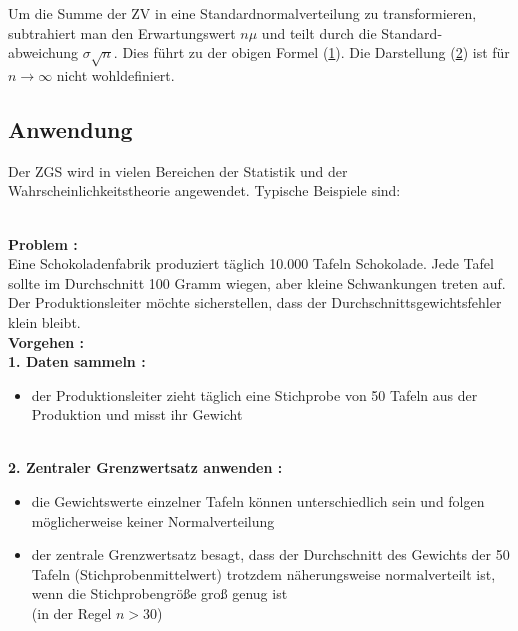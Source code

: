 \documentclass{article}
\begin{document}
Um die Summe der ZV in eine Standardnormalverteilung zu transformieren, subtrahiert man den Erwartungswert $n\mu$ und teilt durch die Standard-\\abweichung $\sigma\sqrt{n}$. Dies führt zu der obigen Formel (\hyperref[eq: Aussage 1 ]{1}). Die Darstellung (\hyperref[eq: Aussage 2 ]{2}) ist für $n\rightarrow \infty$ nicht wohldefiniert.

\subsection{Anwendung}

Der ZGS wird in vielen Bereichen der Statistik und der Wahrscheinlichkeitstheorie angewendet. Typische Beispiele sind:

\label{fn: LFZG }

\newpage

\\ 

\noindent\textbf{Problem :} 
\\ Eine Schokoladenfabrik produziert täglich 10.000 Tafeln Schokolade. Jede Tafel sollte im Durchschnitt 100 Gramm wiegen, aber kleine Schwankungen treten auf. Der Produktionsleiter möchte sicherstellen, dass der Durchschnittsgewichtsfehler klein bleibt.
\\ 

\noindent\textbf{Vorgehen :} 
\\

\noindent\textbf{1. Daten sammeln :} 
\begin{itemize}
    \item der Produktionsleiter zieht täglich eine Stichprobe von 50 Tafeln aus der Produktion und misst ihr Gewicht
\end{itemize}
\\

\noindent\textbf{2. Zentraler Grenzwertsatz anwenden :} 
\begin{itemize}
    \item die Gewichtswerte einzelner Tafeln können unterschiedlich sein und folgen möglicherweise keiner Normalverteilung
    \item der zentrale Grenzwertsatz besagt, dass der Durchschnitt des Gewichts der 50 Tafeln (Stichprobenmittelwert) trotzdem näherungsweise normalverteilt ist, wenn die Stichprobengröße groß genug ist 
    \\(in der Regel $n > 30$)
\end{itemize}
\\
\end{document}
